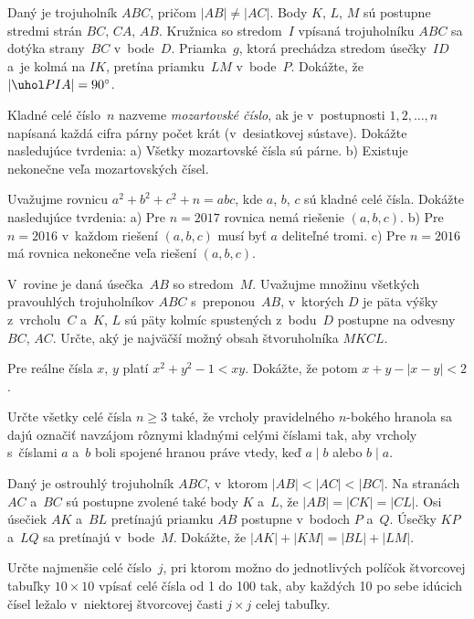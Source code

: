 {%
Daný je trojuholník $ABC$, pričom $|AB|\ne|AC|$. Body $K$, $L$, $M$ sú postupne stredmi strán $BC$, $CA$, $AB$. Kružnica so stredom~$I$ vpísaná trojuholníku $ABC$ sa dotýka strany~$BC$ v~bode~$D$. Priamka~$g$, ktorá prechádza stredom úsečky~$ID$ a~je kolmá na $IK$, pretína priamku~$LM$ v~bode~$P$. Dokážte, že $|\uhol PIA|=90^\circ$.}

{%
Kladné celé číslo~$n$ nazveme {\it mozartovské číslo}, ak je v~postupnosti $1,2,\dots,n$ napísaná každá cifra párny počet krát (v~desiatkovej sústave). Dokážte nasledujúce tvrdenia:
\ite a) Všetky mozartovské čísla sú párne.
\ite b) Existuje nekonečne veľa mozartovských čísel.\endgraf
}

{%
Uvažujme rovnicu $a^2+b^2+c^2+n=abc$, kde $a$, $b$, $c$ sú kladné celé čísla. Dokážte nasledujúce tvrdenia:
\ite a) Pre $n=2017$ rovnica nemá riešenie $(a, b, c)$.
\ite b) Pre $n=2016$ v~každom riešení $(a,b,c)$ musí byť $a$ deliteľné tromi.
\ite c) Pre $n=2016$ má rovnica nekonečne veľa riešení $(a, b, c)$.
\endgraf
}

{%
V~rovine je daná úsečka~$AB$ so stredom~$M$. Uvažujme množinu všetkých pravouhlých trojuholníkov $ABC$ s~preponou~$AB$, v~ktorých $D$
je päta výšky z~vrcholu~$C$ a~$K$, $L$ sú päty kolmíc spustených z~bodu~$D$ postupne na odvesny $BC$, $AC$. Určte, aký je najväčší možný
obsah štvoruholníka $MKCL$.}

{%
Pre reálne čísla $x$, $y$ platí $x^2+y^2-1<xy$. Dokážte, že potom $x+y-|x-y|<2$.
}

{%
Určte všetky celé čísla $n\ge 3$ také, že vrcholy pravidelného $n$-bokého hranola sa dajú označiť navzájom rôznymi kladnými celými číslami tak, aby vrcholy s~číslami $a$ a~$b$ boli spojené hranou práve vtedy, keď $a\mid b$ alebo $b\mid a$.}

{%
Daný je ostrouhlý trojuholník $ABC$, v~ktorom ${|AB|<|AC|<|BC|}$. Na stranách $AC$ a~$BC$ sú postupne zvolené také body $K$ a~$L$, že ${|AB|=|CK|=|CL|}$. Osi úsečiek $AK$ a~$BL$ pretínajú priamku $AB$ postupne v~bodoch $P$ a~$Q$. Úsečky $KP$ a~$LQ$ sa pretínajú v~bode~$M$. Dokážte, že ${|AK|+|KM|=|BL|+|LM|}$.
}

{%
Určte najmenšie celé číslo~$j$, pri ktorom možno do jednotlivých políčok štvorcovej tabuľky $10\times10$ vpísať celé čísla od 1 do 100 tak, aby každých 10 po sebe idúcich čísel ležalo v~niektorej štvorcovej časti $j\times j$ celej tabuľky.
}


